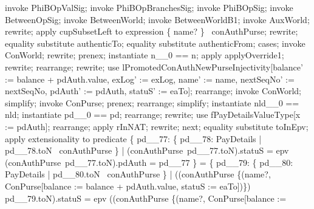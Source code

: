 \begin{LPScript}\begin{zproof}[lPromotedAuxWorldValType]
    invoke PhiBOpValSig;
    invoke PhiBOpBranchesSig;
    invoke PhiBOpSig;
    invoke BetweenOpSig;
    invoke BetweenWorld;
    invoke BetweenWorldB1;
    invoke AuxWorld;
    rewrite;
    apply cupSubsetLeft to expression \{ name? \} \cup \dom~conAuthPurse;
    rewrite;
    equality substitute authenticTo;
    equality substitute authenticFrom;
    cases;
        invoke ConWorld;
        rewrite;
        prenex;
        instantiate n\_\_0 == n;
        apply applyOverride1;
        rewrite;
        rearrange;
        rewrite;
        use lPromotedConAuthNewPurseInjectivity[balance' := balance + pdAuth.value,
            exLog' := exLog, name' := name, nextSeqNo' := nextSeqNo,
            pdAuth' := pdAuth, statuS' := eaTo];
        rearrange;
        invoke ConWorld;
        simplify;
        invoke ConPurse;
        prenex;
        rearrange;
        simplify;
        instantiate nld\_\_0 == nld;
        instantiate pd\_\_0 == pd;
        rearrange;
        rewrite;
        use fPayDetailsValueType[x := pdAuth];
        rearrange;
        apply rInNAT;
        rewrite;
    next;
        equality substitute toInEpv;
        apply extensionality to predicate
            \{ pd\_\_77: \{ pd\_\_78: PayDetails | pd\_\_78.toN \in \dom~conAuthPurse \}
              | (conAuthPurse~pd\_\_77.toN).statuS = epv
             \land (conAuthPurse~pd\_\_77.toN).pdAuth = pd\_\_77 \}
            = \{ pd\_\_79: \{ pd\_\_80: PayDetails | pd\_\_80.toN \in \dom~conAuthPurse \}
              | ((conAuthPurse \oplus \{(name?, \theta ConPurse[balance :=
                  balance + pdAuth.value, statuS := eaTo])\}) pd\_\_79.toN).statuS = epv
              \land ((conAuthPurse \oplus \{(name?, \theta ConPurse[balance :=

\end{zproof}
\end{LPScript}
